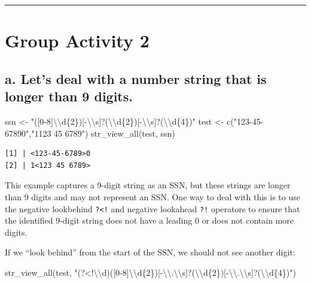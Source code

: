 \documentclass[
]{book}
\newenvironment{Shaded}{\begin{snugshade}}{\end{snugshade}}
\newcommand{\FunctionTok}[1]{\textcolor[rgb]{0.00,0.00,0.00}{#1}}
\newcommand{\NormalTok}[1]{#1}
\newcommand{\OtherTok}[1]{\textcolor[rgb]{0.56,0.35,0.01}{#1}}
\newcommand{\SpecialCharTok}[1]{\textcolor[rgb]{0.00,0.00,0.00}{#1}}
\newcommand{\StringTok}[1]{\textcolor[rgb]{0.31,0.60,0.02}{#1}}
\begin{document}
\begin{center}\rule{0.5\linewidth}{0.5pt}\end{center}

\hypertarget{group-activity-2}{%
\section{Group Activity 2}\label{group-activity-2}}

\hypertarget{a.-lets-deal-with-a-number-string-that-is-longer-than-9-digits.}{%
\subsection{a. Let's deal with a number string that is longer than 9 digits.}\label{a.-lets-deal-with-a-number-string-that-is-longer-than-9-digits.}}

\begin{Shaded}
\begin{Highlighting}[]
\NormalTok{ssn }\OtherTok{\textless{}{-}} \StringTok{"([0{-}8]}\SpecialCharTok{\textbackslash{}\textbackslash{}}\StringTok{d\{2\})[{-}}\SpecialCharTok{\textbackslash{}\textbackslash{}}\StringTok{s]?(}\SpecialCharTok{\textbackslash{}\textbackslash{}}\StringTok{d\{2\})[{-}}\SpecialCharTok{\textbackslash{}\textbackslash{}}\StringTok{s]?(}\SpecialCharTok{\textbackslash{}\textbackslash{}}\StringTok{d\{4\})"}
\NormalTok{test }\OtherTok{\textless{}{-}} \FunctionTok{c}\NormalTok{(}\StringTok{"123{-}45{-}67890"}\NormalTok{,}\StringTok{"1123 45 6789"}\NormalTok{)}
\FunctionTok{str\_view\_all}\NormalTok{(test, ssn)}
\end{Highlighting}
\end{Shaded}

\begin{verbatim}
[1] | <123-45-6789>0
[2] | 1<123 45 6789>
\end{verbatim}

This example captures a 9-digit string as an SSN, but these strings are longer than 9 digits and may not represent an SSN. One way to deal with this is to use the negative lookbehind \texttt{?\textless{}!} and negative lookahead \texttt{?!} operators to ensure that the identified 9-digit string does not have a leading 0 or does not contain more digits.

If we ``look behind'' from the start of the SSN, we should not see another digit:

\begin{Shaded}
\begin{Highlighting}[]
\FunctionTok{str\_view\_all}\NormalTok{(test, }\StringTok{"(?\textless{}!}\SpecialCharTok{\textbackslash{}\textbackslash{}}\StringTok{d)([0{-}8]}\SpecialCharTok{\textbackslash{}\textbackslash{}}\StringTok{d\{2\})[{-}}\SpecialCharTok{\textbackslash{}\textbackslash{}}\StringTok{.}\SpecialCharTok{\textbackslash{}\textbackslash{}}\StringTok{s]?(}\SpecialCharTok{\textbackslash{}\textbackslash{}}\StringTok{d\{2\})[{-}}\SpecialCharTok{\textbackslash{}\textbackslash{}}\StringTok{.}\SpecialCharTok{\textbackslash{}\textbackslash{}}\StringTok{s]?(}\SpecialCharTok{\textbackslash{}\textbackslash{}}\StringTok{d\{4\})"}\NormalTok{)}
\end{Highlighting}
\end{Shaded}
\end{document}
